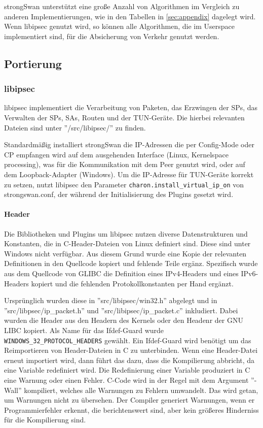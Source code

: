 strongSwan unterstützt eine große Anzahl von Algorithmen im Vergleich zu anderen Implementierungen,
wie in den Tabellen in \autoref{sec:appendix} dagelegt wird. Wenn libipsec genutzt wird,
so können alle Algorithmen, die im Userspace implementiert sind, für die Absicherung
von Verkehr genutzt werden.

\subsection{Portierung}
\subsubsection{libipsec}
libipsec implementiert die Verarbeitung von Paketen, das Erzwingen der \acp{SP},
das Verwalten der \acp{SP}, \acp{SA}, Routen und der TUN-Geräte.
Die hierbei relevanten Dateien sind unter ''/src/libipsec/'' zu finden.

Standardmäßig installiert strongSwan die IP-Adressen die per Config-Mode
oder \ac{CP} empfangen wird auf dem ausgehenden Interface (Linux, Kernelspace processing),
was für die Kommunikation mit dem Peer genutzt wird,
oder auf dem Loopback-Adapter (Windows).
Um die IP-Adresse für TUN-Geräte korrekt zu setzen, nutzt libipsec den Parameter
\texttt{charon.install\_virtual\_ip\_on} von strongswan.conf, der während der Initialisierung
des Plugins gesetzt wird.
\paragraph{Header}
Die Bibliotheken und Plugins um libipsec nutzen diverse Datenstrukturen und Konstanten,
die in C-Header-Dateien von Linux definiert sind. Diese sind unter Windows nicht verfügbar.
Aus diesem Grund wurde eine Kopie der relevanten Definitionen in den Quellcode kopiert
und fehlende Teile ergänz.
Spezifisch wurde aus dem Quellcode von GLIBC die Definition eines \ac{IP}v4-Headers
und eines \ac{IP}v6-Headers kopiert und die fehlenden Protokollkonstanten per Hand ergänzt.

Ursprünglich wurden diese in ''src/libipsec/win32.h'' abgelegt und in ''src/libpsec/ip\_packet.h'' und ''src/libipsec/ip\_packet.c''
inkludiert. Dabei wurden die Header aus den Headern des Kernels oder den Headenr der GNU LIBC kopiert.
Als Name für das Ifdef-Guard wurde \texttt{WINDOWS\_32\_PROTOCOL\_HEADERS} gewählt. Ein Ifdef-Guard wird benötigt um das Reimportieren
von Header-Dateien in C zu unterbinden. Wenn eine Header-Datei erneut importiert wird,
dann führt das dazu, dass die Kompilierung abbricht, da eine Variable redefiniert wird.
Die Redefinierung einer Variable produziert in C eine Warnung oder einen Fehler.
C-Code wird in der Regel mit dem Argument ''-Wall'' kompiliert, welches
alle Warnungen zu Fehlern umwandelt. Das wird getan, um Warnungen nicht zu übersehen.
Der Compiler generiert Warnungen, wenn er Programmierfehler erkennt,
die berichtenswert sind, aber kein größeres Hinderniss für die Kompilierung sind.

